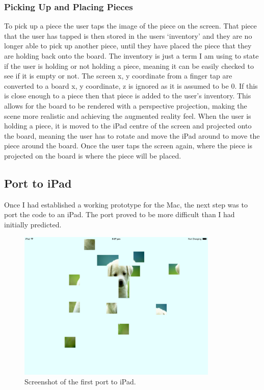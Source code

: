 \documentclass{article}
\begin{document}
\subsubsection{Picking Up and Placing Pieces}
To pick up a piece the user taps the image of the piece on the screen. That piece that the user has tapped is then stored in the users `inventory' and they are no longer able to pick up another piece, until they have placed the piece that they are holding back onto the board. The inventory is just a term I am using to state if the user is holding or not holding a piece, meaning it can be easily checked to see if it is empty or not. The screen x, y coordinate from a finger tap are converted to a board x, y coordinate, z is ignored as it is assumed to be 0. If this is close enough to a piece then that piece is added to the user's inventory. This allows for the board to be rendered with a perspective projection, making the scene more realistic and achieving the augmented reality feel. When the user is holding a piece, it is moved to the iPad centre of the screen and projected onto the board, meaning the user has to rotate and move the iPad around to move the piece around the board. Once the user taps the screen again, where the piece is projected on the board is where the piece will be placed.

\subsection{Port to iPad}
Once I had established a working prototype for the Mac, the next step was to port the code to an iPad. The port proved to be more difficult than I had initially predicted. 

\begin{figure}[ht]
\begin{center}
\includegraphics[width=0.85\textwidth]{images/iPadPortImage}
\caption{Screenshot of the first port to iPad.}
\label{fig:iPadPort}
\end{center}
\end{figure}
\end{document}
